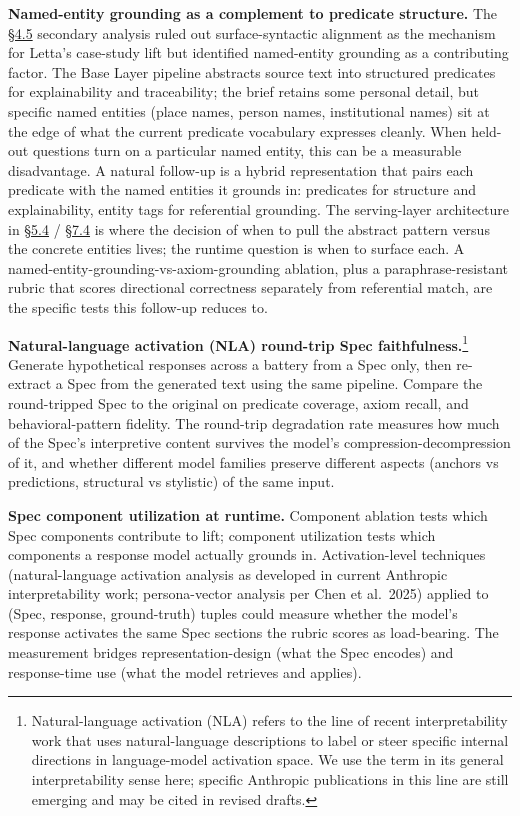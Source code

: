 \textbf{Named-entity grounding as a complement to predicate structure.}
The \hyperref[exploratory-case-study-letta-stateful-agent-n3-post-hoc]{§4.5} secondary analysis ruled out surface-syntactic alignment as the
mechanism for Letta's case-study lift but identified named-entity
grounding as a contributing factor. The Base Layer pipeline abstracts
source text into structured predicates for explainability and
traceability; the brief retains some personal detail, but specific named
entities (place names, person names, institutional names) sit at the
edge of what the current predicate vocabulary expresses cleanly. When
held-out questions turn on a particular named entity, this can be a
measurable disadvantage. A natural follow-up is a hybrid representation
that pairs each predicate with the named entities it grounds in:
predicates for structure and explainability, entity tags for referential
grounding. The serving-layer architecture in \hyperref[composition-with-retrieval]{§5.4} / \hyperref[production-serving-and-infrastructure]{§7.4} is where the
decision of when to pull the abstract pattern versus the concrete
entities lives; the runtime question is when to surface each. A
named-entity-grounding-vs-axiom-grounding ablation, plus a
paraphrase-resistant rubric that scores directional correctness
separately from referential match, are the specific tests this follow-up
reduces to.

\textbf{Natural-language activation (NLA) round-trip Spec
faithfulness.}\footnote{Natural-language activation (NLA) refers to the
  line of recent interpretability work that uses natural-language
  descriptions to label or steer specific internal directions in
  language-model activation space. We use the term in its general
  interpretability sense here; specific Anthropic publications in this
  line are still emerging and may be cited in revised drafts.} Generate
hypothetical responses across a battery from a Spec only, then
re-extract a Spec from the generated text using the same pipeline.
Compare the round-tripped Spec to the original on predicate coverage,
axiom recall, and behavioral-pattern fidelity. The round-trip
degradation rate measures how much of the Spec's interpretive content
survives the model's compression-decompression of it, and whether
different model families preserve different aspects (anchors vs
predictions, structural vs stylistic) of the same input.

\textbf{Spec component utilization at runtime.} Component ablation tests
which Spec components contribute to lift; component utilization tests
which components a response model actually grounds in. Activation-level
techniques (natural-language activation analysis as developed in current
Anthropic interpretability work; persona-vector analysis per Chen et
al.~2025) applied to (Spec, response, ground-truth) tuples could measure
whether the model's response activates the same Spec sections the rubric
scores as load-bearing. The measurement bridges representation-design
(what the Spec encodes) and response-time use (what the model retrieves
and applies).

